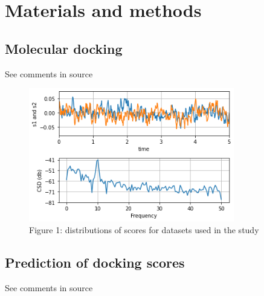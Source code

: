 \section{Materials and methods}

\subsection{Molecular docking}
See comments in source

\begin{figure}[h]
\centering
\includegraphics[width=0.8\textwidth]{figures/fig1.png}
\caption{Figure 1: distributions of scores for datasets used in the study}
\end{figure}


\subsection{Prediction of docking scores}
See comments in source

